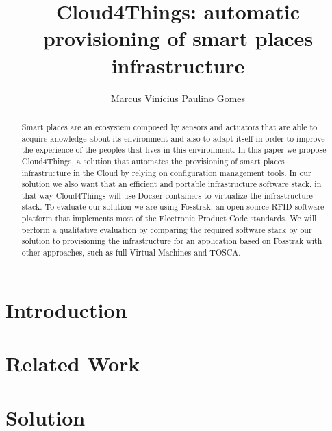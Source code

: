 \documentclass{../llncs2e/llncs}
\title{Cloud4Things: automatic provisioning of smart places infrastructure}
\author{\Large Marcus Vin\'icius Paulino Gomes}
\institute{\large T\'ecnico Lisboa, Universidade T\'ecnica de Lisboa\\
 \email{\{marcus.paulino.gomes\}@tecnico.ulisboa.pt}}
\begin{document}
\maketitle
\begin{abstract}
Smart places are an ecosystem composed by sensors and actuators that are able to acquire knowledge
about its environment and also to adapt itself in order to improve the experience of the peoples
that lives in this environment. In this paper we propose Cloud4Things, a solution that automates
the provisioning of smart places infrastructure in the Cloud by relying on configuration management
tools. In our solution we also want that an efficient and portable infrastructure software stack,
in that way Cloud4Things will use Docker containers to virtualize the infrastructure stack. To
evaluate our solution we are using Fosstrak, an open source RFID software platform that implements
most of the Electronic Product Code standards. We will perform a qualitative evaluation by comparing
the required software stack by our solution to provisioning the infrastructure for an application
based on Fosstrak with other approaches, such as full Virtual Machines and TOSCA.
\end{abstract}
\section{Introduction}
\label{sec:introduction}
\section{Related Work}
\label{sec:related_work}
\section{Solution}
\label{sec:solution}
\end{document}
